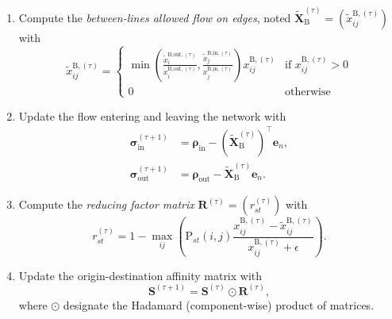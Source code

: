 \documentclass[11p]{article}
\begin{document}
\begin{enumerate}
	\item Compute the \emph{between-lines allowed flow on edges}, noted $\widetilde{\mathbf{X}}_\text{B}^{(\tau)} = (\widetilde{x}_{ij}^{\text{B},(\tau)})$ with 
	\begin{equation}
		\widetilde{x}_{ij}^{\text{B},(\tau)} = \begin{cases}
			\min \left(\frac{\tilde{x}^{\text{B,out},(\tau)}_i}{x^{\text{B,out},(\tau)}_i} , \frac{\tilde{x}^{\text{B,in},(\tau)}_j}{x^{\text{B,in},(\tau)}_j} \right)  x^{\text{B},(\tau)}_{ij} & \text{if } x^{\text{B},(\tau)}_{ij} > 0\\
			0 & \text{otherwise}
			\end{cases}
	\end{equation}
	\item Update the flow entering and leaving the network with
		\begin{align}
			\bm{\sigma}^{(\tau+1)}_\text{in} &= \bm{\rho}_\text{in} -  (\widetilde{\mathbf{X}}^{(\tau)}_\text{B})^\top \mathbf{e}_n, \\
			\bm{\sigma}^{(\tau+1)}_\text{out} &= \bm{\rho}_\text{out} -  \widetilde{\mathbf{X}}^{(\tau)}_\text{B} \mathbf{e}_n.
		\end{align}
	\item Compute the \emph{reducing factor matrix} $\mathbf{R}^{(\tau)} = (r^{(\tau)}_{st})$ with 
	\begin{equation}
		r^{(\tau)}_{st} = 1 - \max_{ij} \left( \text{P}_{st}(i, j) \frac{x_{ij}^{\text{B},(\tau)}  - \widetilde{x}_{ij}^{\text{B},(\tau)}}{x_{ij}^{\text{B},(\tau)} + \epsilon} \right).
	\end{equation}
	\item Update the origin-destination affinity matrix with
	\begin{equation}
		\mathbf{S}^{(\tau + 1)} = \mathbf{S}^{(\tau)} \odot \mathbf{R}^{(\tau)},
	\end{equation}
	where $\odot$ designate the Hadamard (component-wise) product of matrices. 
\end{enumerate}
\end{document}
